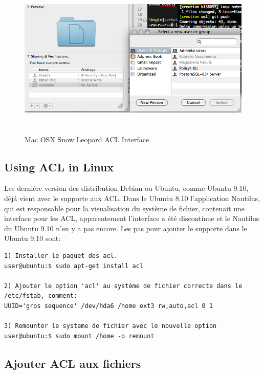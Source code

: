 \begin{figure}[htbp]
	\centering
		\includegraphics[height=3in]{img/mac-acl.png}
	\caption{Mac OSX Snow Leopard ACL Interface}
	\label{fig:img_mac-acl}
\end{figure}




\subsection*{Using ACL in Linux}


Les dernière version des distribution Debian ou Ubuntu, comme Ubuntu 9.10, dèjá vient avec le supporte aux ACL. Dans le Ubuntu 8.10 l'application Nautilus, qui est responsable pour la visualisation du système de fichier, contenait une interface pour les ACL, apparentement l'interface a été discontinue et le Nautilus du Ubuntu 9.10 n'en y a pas encore. Les pas pour ajouter le supporte dans le Ubuntu 9.10 sont:

\begin{verbatim}
1) Installer le paquet des acl. 
user@ubuntu:$ sudo apt-get install acl
 
2) Ajouter le option 'acl' au système de fichier correcte dans le /etc/fstab, comment:
UUID='gros sequence' /dev/hda6 /home ext3 rw,auto,acl 0 1

3) Remounter le systeme de fichier avec le nouvelle option
user@ubuntu:$ sudo mount /home -o remount

\end{verbatim}

\subsection*{Ajouter ACL aux fichiers}

